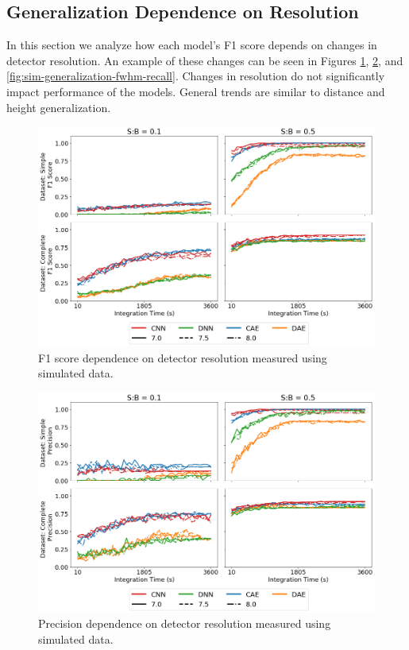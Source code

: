 \subsection{Generalization Dependence on Resolution}

In this section we analyze how each model's F1 score depends on changes in detector resolution. An example of these changes can be seen in Figures \ref{fig:sim-generalization-fwhm-f1}, \ref{fig:sim-generalization-fwhm-precision}, and \ref{fig:sim-generalization-fwhm-recall}. Changes in resolution do not significantly impact performance of the models. General trends are similar to distance and height generalization. 

\begin{figure}[H]
	\centering
	\includegraphics[width=1.0\linewidth]{images/sim-generalization-fwhm-f1}
	\caption{F1 score dependence on detector resolution measured using simulated data.}
	\label{fig:sim-generalization-fwhm-f1}
\end{figure}

\begin{figure}[H]
	\centering
	\includegraphics[width=1.0\linewidth]{images/sim-generalization-fwhm-precision}
	\caption{Precision dependence on detector resolution measured using simulated data.}
	\label{fig:sim-generalization-fwhm-precision}
\end{figure}

